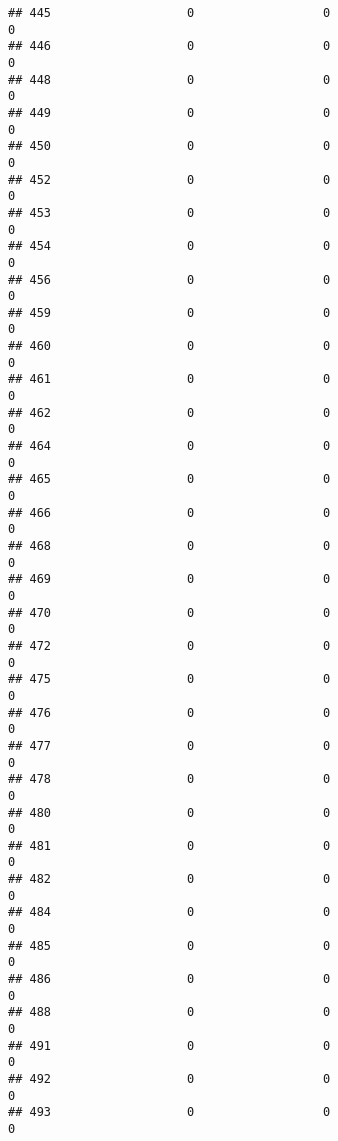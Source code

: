 \documentclass[
]{article}
\begin{document}
\begin{verbatim}
## 445                   0                  0                              0
## 446                   0                  0                              0
## 448                   0                  0                              0
## 449                   0                  0                              0
## 450                   0                  0                              0
## 452                   0                  0                              0
## 453                   0                  0                              0
## 454                   0                  0                              0
## 456                   0                  0                              0
## 459                   0                  0                              0
## 460                   0                  0                              0
## 461                   0                  0                              0
## 462                   0                  0                              0
## 464                   0                  0                              0
## 465                   0                  0                              0
## 466                   0                  0                              0
## 468                   0                  0                              0
## 469                   0                  0                              0
## 470                   0                  0                              0
## 472                   0                  0                              0
## 475                   0                  0                              0
## 476                   0                  0                              0
## 477                   0                  0                              0
## 478                   0                  0                              0
## 480                   0                  0                              0
## 481                   0                  0                              0
## 482                   0                  0                              0
## 484                   0                  0                              0
## 485                   0                  0                              0
## 486                   0                  0                              0
## 488                   0                  0                              0
## 491                   0                  0                              0
## 492                   0                  0                              0
## 493                   0                  0                              0

\end{verbatim}
\end{document}
